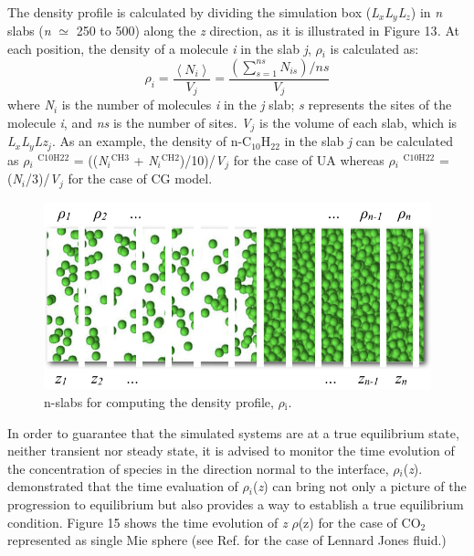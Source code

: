 \documentclass{scrbook}
\begin{document}
The density profile is calculated by dividing the simulation box
(\textit{L}$_{x}$\textit{L}$_{y}$\textit{L}$_{z}$) in \textit{n} slabs
(\textit{n} ${\simeq}$ 250 to 500) along the \textit{z} direction, as it is
illustrated in Figure 13\textit{.} At each position, the density of a molecule
\textit{i} in the slab \textit{j}, {${\rho}$}$_{i}$  is calculated as:
\begin{equation}
\rho_{i}=\frac{\left\langle N_{i}\right\rangle }{V_{j}}=\frac{\left(\sum_{s=1}^{ns}N_{is}\right)/ns}{V_{j}}
\end{equation}
where \textit{N}$_{i}$ is the number of molecules \textit{i} in the \textit{j}
slab; \textit{s} represents the sites of the molecule \textit{i}, and
\textit{ns} is the number of sites. \textit{V}$_{j}$ is the volume of each
slab, which is \textit{L}$_{x}$\textit{L}$_{y}$\textit{Lz}$_{j}$. As an
example, the density of n-C$_{10}$H$_{22}$ in the slab \textit{j} can be
calculated as {${\rho}$}$_{i}$ $^{\mathrm{C10H22}}$
= ((\textit{N}$_{i}$$^{\mathrm{CH3}}$
+ \textit{N}$_{i}$$^{\mathrm{CH2}}$)/10)/\textit{V}$_{j}$ for the case of UA
whereas {${\rho}$}$_{i}$ $^{\mathrm{C10H22}}$
= (\textit{N}$_{i}$/3)/\textit{V}$_{j}$ for the case of CG model.

\begin{figure}
\includegraphics[width=1\textwidth]{gfx/image51.png}
\caption{n-slabs for computing the density profile, ${\rho}$$_{\mathrm{i}}$.}
\label{fig:7}
\end{figure}

In order to guarantee that the simulated systems are at a true equilibrium
state, neither transient nor steady state, it is advised to monitor the time
evolution of the concentration of species in the direction normal to the
interface, {${\rho}$}$_{i}$(\textit{z}). \citet{holcomb1993} demonstrated that the time evaluation of
{${\rho}$}$_{i}$(\textit{z}) can bring not only a picture of the progression to
equilibrium but also provides a way to establish a true equilibrium condition.
Figure 15 shows the time evolution of \textit{z} \textendash{} {${\rho}$}(z)
for the case of CO$_{2}$ represented as single Mie sphere (see Ref. \citep{mejia2005} for the case of
Lennard \textendash{} Jones fluid.) 
\end{document}
